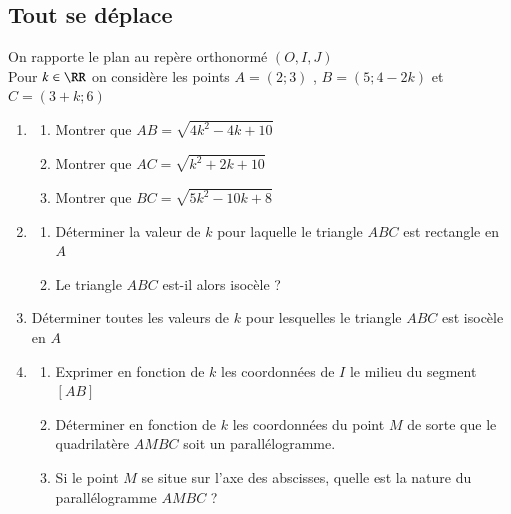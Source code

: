 \documentclass[oneside,12pt]{article}          %
\begin{document}
\subsection{Tout se déplace}
On rapporte le plan au repère orthonormé $(O,I,J)$ \\
Pour $k\in\RR$ on considère les points $A=(2;3)$ , $B=(5;4-2k)$ et $C=(3+k;6)$
\begin{enumerate}
	\item \begin{enumerate}
		\item Montrer que $AB=\sqrt{4k^2-4k+10}$
		\item Montrer que $AC=\sqrt{k^2+2k+10}$
		\item Montrer que $BC=\sqrt{5k^2-10k+8}$
	\end{enumerate}
	\item \begin{enumerate}
		\item Déterminer la valeur de $k$ pour laquelle le triangle $ABC$ est rectangle en $A$
		\item Le triangle $ABC$ est-il alors isocèle ?
	\end{enumerate}
	\item Déterminer toutes les valeurs de $k$ pour lesquelles le triangle $ABC$ est isocèle en $A$
	\item \begin{enumerate}
		\item Exprimer en fonction de $k$ les coordonnées de $I$ le milieu du segment $[AB]$
		\item Déterminer en fonction de $k$ les coordonnées du point $M$ de sorte que le quadrilatère $AMBC$ soit un parallélogramme.
		\item Si le point $M$ se situe sur l'axe des abscisses, quelle est la nature du parallélogramme $AMBC$ ?
	\end{enumerate}
\end{enumerate}
\end{document}
